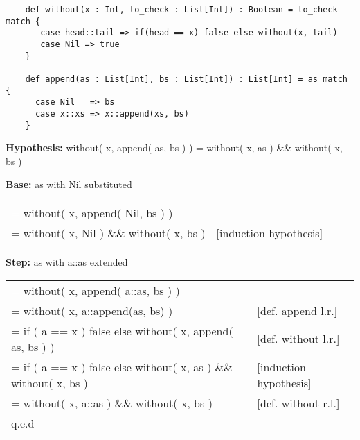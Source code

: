 \documentclass[10pt, a4paper]{article}
\begin{document}
    

    \begin{verbatim}
    def without(x : Int, to_check : List[Int]) : Boolean = to_check match {
       case head::tail => if(head == x) false else without(x, tail)
       case Nil => true
    }
    
    def append(as : List[Int], bs : List[Int]) : List[Int] = as match {
      case Nil   => bs
      case x::xs => x::append(xs, bs)
    }
    \end{verbatim}
    
    \begin{description}
        \item \textbf{Hypothesis:} without( x, append( as, bs ) ) = without( x, as ) \&\& without( x, bs )
        \item \textbf{Base:} as with Nil substituted \\
            \begin{tabular}{ l l }
                \textcolor{white}{=} without( x, append( Nil, bs ) )       & \\
                = without( x, Nil ) \&\& without( x, bs )                 & [induction hypothesis] \\
            \end{tabular}
        \item \textbf{Step:} as with a::as extended \\
            \begin{tabular}{ l l }
                \textcolor{white}{=} without( x, append( a::as, bs ) )    &                           \\
                = without( x, a::append(as, bs) )                       & [def. append l.r.]  \\
                = if ( a == x ) false else without( x, append( as, bs ) )     & [def. without l.r.] \\
                = if ( a == x ) false else without( x, as ) \&\& without( x, bs ) & [induction hypothesis] \\
                = without( x, a::as ) \&\& without( x, bs )                 & [def. without r.l.] \\
                q.e.d
            \end{tabular}
    \end{description}


\end{document}

